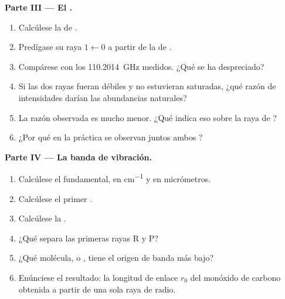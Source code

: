 \begin{problem}
\medskip\noindent\textbf{Parte III --- El .}
\begin{enumerate}[resume]
  \item Calcúlese la  de .
  \item Predígase su raya $1 \leftarrow 0$ a partir de la de .
  \item Compárese con los \qty{110.2014}{GHz} medidos. ¿Qué se ha despreciado?
  \item Si las dos rayas fueran débiles y no estuvieran saturadas, ¿qué razón de
        intensidades darían las abundancias naturales?
  \item La razón observada es mucho menor. ¿Qué indica eso sobre la raya de
        ?
  \item ¿Por qué en la práctica se observan juntos ambos ?
\end{enumerate}

\medskip\noindent\textbf{Parte IV --- La banda de vibración.}
\begin{enumerate}[resume]
  \item Calcúlese el  fundamental, en \unit{cm^{-1}} y en
        micrómetros.
  \item Calcúlese el primer .
  \item Calcúlese la .
  \item ¿Qué separa las primeras rayas R y P?
  \item ¿Qué molécula,  o , tiene el origen de banda más bajo?
  \item Enúnciese el resultado: la longitud de enlace $r_0$ del monóxido de carbono obtenida
        a partir de una sola raya de radio.
\end{enumerate}
\end{problem}
